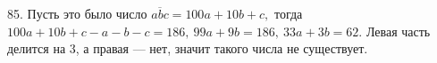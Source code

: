 85. Пусть это было число $\overline{abc}=100a+10b+c,$ тогда $100a+10b+c-a-b-c=186,\ 99a+9b=186,\ 33a+3b=62.$ Левая часть делится на 3, а правая --- нет, значит такого числа не существует.\\
